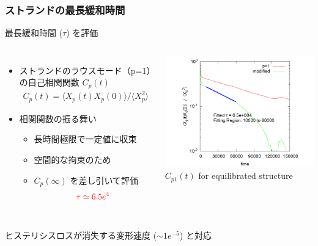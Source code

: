 \documentclass[12pt, dvipdfmx]{beamer}
\begin{document}
\begin{frame}
	\frametitle{ストランドの最長緩和時間}
	\begin{exampleblock}{最長緩和時間 ($\tau$) を評価}
		\begin{columns}[totalwidth=\linewidth]
			\begin{itemize}
				\item ストランドのラウスモード（p=1）の自己相関関数 $C_p(t)$
				\small
				\begin{align*}
					C_p(t) = \langle X_p(t)X_p(0) \rangle/\langle X_p^2 \rangle
				\end{align*}
				\normalsize
				\item 相関関数の振る舞い
				\begin{itemize}
					\item 長時間極限で一定値に収束
					\item 空間的な拘束のため
					\item $C_p(\infty)$ を差し引いて評価
					\small
					\begin{align*}
						\textcolor{red}{\tau \simeq 6.5e^{4}}
					\end{align*}
					\normalsize
				\end{itemize}
			\end{itemize}
				\centering
					\includegraphics[width=\textwidth]{Xp_1_org.png}\\
					\scriptsize{$C_{p1}(t)$ for equilibrated structure}
		\end{columns}
	\vspace*{2mm}
		\alert{ヒステリシスロスが消失する変形速度 ($\sim 1e^{-5}$) と対応}
	\end{exampleblock}
		
\end{frame}
\end{document}
